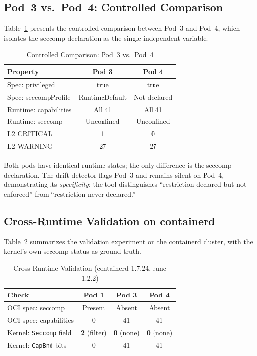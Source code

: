 \documentclass[conference]{IEEEtran}
\begin{document}
\subsection{Pod~3 vs.\ Pod~4: Controlled Comparison}

Table~\ref{tab:comparison} presents the controlled comparison between Pod~3 and Pod~4, which isolates the seccomp declaration as the single independent variable.

\begin{table}[htbp]
\caption{Controlled Comparison: Pod~3 vs.\ Pod~4}
\label{tab:comparison}
\centering
\begin{tabular}{lcc}
\toprule
\textbf{Property} & \textbf{Pod 3} & \textbf{Pod 4} \\
\midrule
Spec: privileged     & true & true \\
Spec: seccompProfile & RuntimeDefault & Not declared \\
Runtime: capabilities & All 41 & All 41 \\
Runtime: seccomp     & Unconfined & Unconfined \\
L2 CRITICAL          & \textbf{1} & \textbf{0} \\
L2 WARNING           & 27 & 27 \\
\bottomrule
\end{tabular}
\end{table}

Both pods have identical runtime states; the only difference is the seccomp declaration. The drift detector flags Pod~3 and remains silent on Pod~4, demonstrating its \emph{specificity}: the tool distinguishes ``restriction declared but not enforced'' from ``restriction never declared.''

\subsection{Cross-Runtime Validation on containerd}
\label{sec:crossruntime}

Table~\ref{tab:crossruntime} summarizes the validation experiment on the containerd cluster, with the kernel's own seccomp status as ground truth.

\begin{table}[htbp]
\caption{Cross-Runtime Validation (containerd 1.7.24, runc 1.2.2)}
\label{tab:crossruntime}
\centering
\begin{tabular}{lccc}
\toprule
\textbf{Check} & \textbf{Pod 1} & \textbf{Pod 3} & \textbf{Pod 4} \\
\midrule
OCI spec: seccomp     & Present & Absent & Absent \\
OCI spec: capabilities & 0 & 41 & 41 \\
Kernel: \texttt{Seccomp} field & \textbf{2} (filter) & \textbf{0} (none) & \textbf{0} (none) \\
Kernel: \texttt{CapBnd} bits  & 0 & 41 & 41 \\
\bottomrule
\end{tabular}
\end{table}
\end{document}
